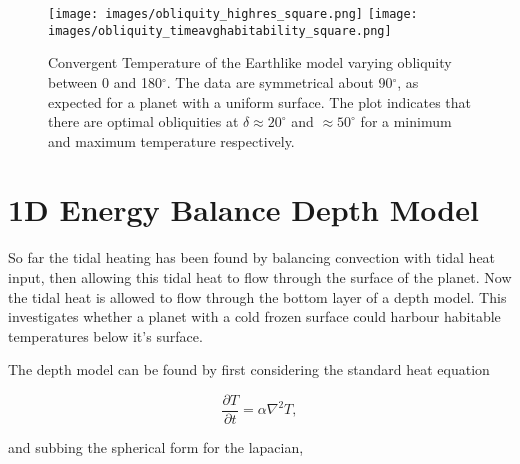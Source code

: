 \documentclass[12pt, onecolumn]{revtex4-2}    %
\begin{document}
\begin{figure}
    \texttt{[image: images/obliquity\_highres\_square.png]}
    \texttt{[image: images/obliquity\_timeavghabitability\_square.png]}
    \caption{Convergent Temperature of the Earthlike model varying obliquity between 0 and 180$^{\circ}$.
        The data are symmetrical about 90$^{\circ}$, as expected for a planet with a uniform surface.
        The plot indicates that there are optimal obliquities at $\delta \approx 20^{\circ}$ and $\approx 50^{\circ}$ for a minimum and maximum temperature respectively.
    }
    \label{fig:temperature_obliquity}
\end{figure}

%     


\section{1D Energy Balance Depth Model}

So far the tidal heating has been found by balancing convection with tidal heat input, then allowing this tidal heat to flow through the surface of the planet.
Now the tidal heat is allowed to flow through the bottom layer of a depth model.
This investigates whether a planet with a cold frozen surface could harbour habitable temperatures below it's surface.

The depth model can be found by first considering the standard heat equation

\begin{equation}
    \frac{\partial T}{\partial t} = \alpha \nabla^2 T,
\end{equation}

and subbing the spherical form for the lapacian,
\end{document}
